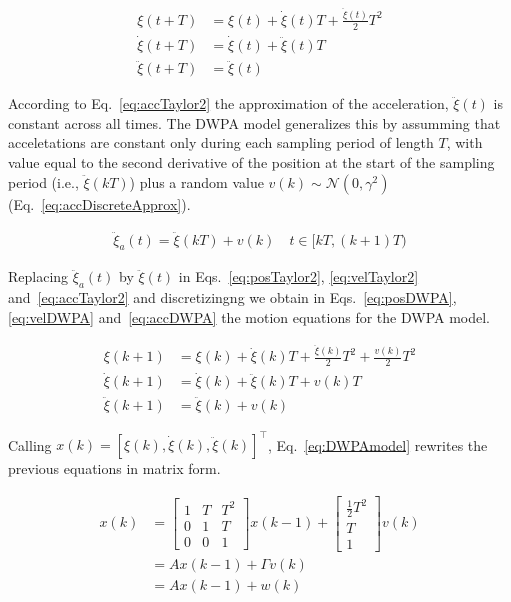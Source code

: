 \documentclass[fleqn]{article}
\begin{document}
\begin{align}
    \xi(t+T)&=\xi(t)+\dot{\xi}(t)T+\frac{\ddot{\xi}(t)}{2}T^2\label{eq:posTaylor2}\\
    \dot{\xi}(t+T)&=\dot{\xi}(t)+\ddot{\xi}(t)T\label{eq:velTaylor2}\\
    \ddot{\xi}(t+T)&=\ddot{\xi}(t)\label{eq:accTaylor2}
\end{align}

According to Eq.~\ref{eq:accTaylor2} the approximation of the acceleration,
$\ddot{\xi}(t)$ is constant across all times. The DWPA model generalizes this
by assumming that acceletations are constant only during each sampling period
of length $T$, with value equal to the second derivative of the position at the
start of the sampling period (i.e., $\ddot{\xi}(kT)$) plus a random value
$v(k)\sim\mathcal{N}(0,\gamma^2)$ (Eq.~\ref{eq:accDiscreteApprox}).

\begin{align}
    \ddot{\xi}_a(t)=\ddot{\xi}(kT)+v(k)\quad t\in[kT,(k+1)T)\label{eq:accDiscreteApprox}
\end{align}

Replacing $\ddot{\xi}_a(t)$ by $\ddot{\xi}(t)$ in Eqs.~\ref{eq:posTaylor2},
\ref{eq:velTaylor2} and~\ref{eq:accTaylor2} and discretizingng we obtain in
Eqs.~\ref{eq:posDWPA}, \ref{eq:velDWPA} and~\ref{eq:accDWPA} the motion
equations for the DWPA model.

\begin{align}
    \xi(k+1)&=\xi(k)+\dot{\xi}(k)T+\frac{\ddot{\xi}(k)}{2}T^2+\frac{v(k)}{2}T^2\label{eq:posDWPA}\\
    \dot{\xi}(k+1)&=\dot{\xi}(k)+\ddot{\xi}(k)T+v(k)T\label{eq:velDWPA}\\
    \ddot{\xi}(k+1)&=\ddot{\xi}(k)+v(k)\label{eq:accDWPA}
\end{align}

Calling $x(k)=[\xi(k), \dot{\xi}(k), \ddot{\xi}(k)]^\intercal$,
Eq.~\ref{eq:DWPAmodel} rewrites the previous
equations in matrix form.

\begin{align}
    x(k)&=\begin{bmatrix}
        1 & T & T^2\\
        0 & 1 & T\\
        0 & 0 & 1
           \end{bmatrix}
           x(k-1)+
           \begin{bmatrix}
               \frac{1}{2}T^2\\
               T\\
               1
           \end{bmatrix}
           v(k)\nonumber\\
           &=Ax(k-1)+\Gamma v(k)\nonumber\\
           &=Ax(k-1)+w(k)\label{eq:DWPAmodel}
\end{align}
\end{document}
